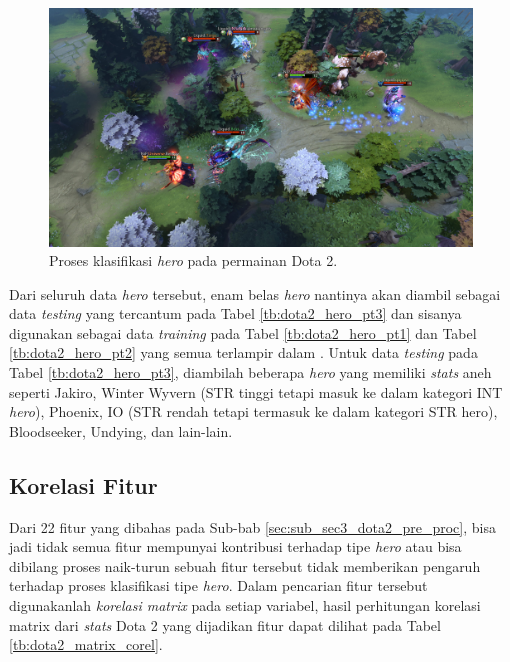 \begin{figure} [!h] \centering
	\includegraphics[scale=0.13]{img/dota2_gameplay.jpg}
	\caption{Proses klasifikasi \textit{hero} pada permainan Dota 2.}
	\label{fig:dota2_gameplay}
\end{figure}

Dari seluruh data \textit{hero} tersebut, enam belas \textit{hero} nantinya akan diambil sebagai data \textit{testing} yang tercantum pada Tabel \ref{tb:dota2_hero_pt3} dan sisanya digunakan sebagai data \textit{training} pada Tabel \ref{tb:dota2_hero_pt1} dan Tabel \ref{tb:dota2_hero_pt2} yang semua terlampir dalam . Untuk data \textit{testing} pada Tabel \ref{tb:dota2_hero_pt3}, diambilah beberapa \textit{hero} yang memiliki \textit{stats} aneh seperti Jakiro, Winter Wyvern (STR tinggi tetapi masuk ke dalam kategori INT \textit{hero}), Phoenix, IO (STR rendah tetapi termasuk ke dalam kategori STR hero), Bloodseeker, Undying, dan lain-lain.
\vspace{1ex}

\subsection{Korelasi Fitur}
\label{sec:sub_sec3_dota2_feature_corel}
\vspace{1ex}

Dari 22 fitur yang dibahas pada Sub-bab \ref{sec:sub_sec3_dota2_pre_proc}, bisa jadi tidak semua fitur mempunyai kontribusi terhadap tipe \textit{hero} atau bisa dibilang proses naik-turun sebuah fitur tersebut tidak memberikan pengaruh terhadap proses klasifikasi tipe \textit{hero}. Dalam pencarian fitur tersebut digunakanlah \textit{korelasi matrix} pada setiap variabel, hasil perhitungan korelasi matrix dari \textit{stats} Dota 2 yang dijadikan fitur dapat dilihat pada Tabel \ref{tb:dota2_matrix_corel}.
\vspace{-1ex}

